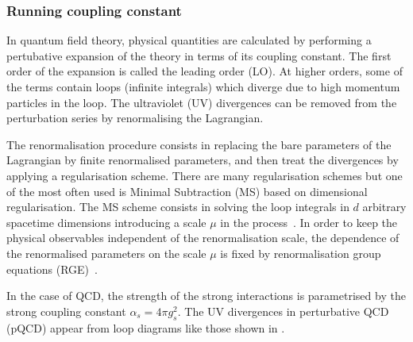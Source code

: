 \subsubsection{Running coupling constant}

In quantum field theory, physical quantities are calculated by performing a pertubative expansion of the theory in terms of its coupling constant. The first order of the expansion is called the leading order (LO). At higher orders, some of the terms contain loops (infinite integrals) which diverge due to high momentum particles in the loop. The ultraviolet (UV) divergences can be removed from the perturbation series by renormalising the Lagrangian.

The renormalisation procedure consists in replacing the bare parameters of the Lagrangian by finite renormalised parameters, and then treat the divergences by applying a regularisation scheme. There are many regularisation schemes but one of the most often used is Minimal Subtraction (MS) based on dimensional regularisation. The MS scheme consists in solving the loop integrals in $d$ arbitrary spacetime dimensions introducing a scale $\mu$ in the process~\cite{Renomalization}. In order to keep the physical observables independent of the renormalisation scale, the dependence of the renormalised parameters on the scale $\mu$ is fixed by renormalisation group equations (RGE)~\cite{Renomalization}.

In the case of QCD, the strength of the strong interactions is parametrised by the strong coupling constant $\alpha_{s} = 4{\pi}g_{s}^{2}$. The UV divergences in perturbative QCD (pQCD) appear from loop diagrams like those shown in .

